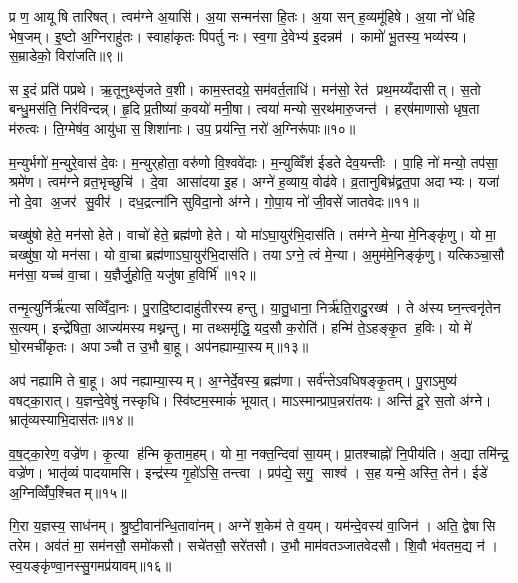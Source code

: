 प्र ण॒ आयूषि तारिषत्। त्वम॑ग्ने अ॒यासि॑। अ॒या सन्मन॑सा हि॒तः। अ॒या सन् ह॒व्यमू॑हिषे। अ॒या नो॑ धेहि भेष॒जम्। इ॒ष्टो अ॒ग्निराहु॑तः। स्वाहा॑कृतः पिपर्तु नः। स्व॒गा दे॒वेभ्य॑ इ॒दन्नम॑। कामो॑ भू॒तस्य॒ भव्य॑स्य। स॒म्राडेको॒ विरा॑जति॥९॥

स इ॒दं प्रति॑ पप्रथे। ऋ॒तूनुथ्सृ॑जते व॒शी। काम॒स्तदग्रे॒ सम॑वर्त॒ताधि॑। मन॑सो॒ रेत॑ प्रथ॒मय्यँदासीत्। स॒तो बन्धु॒मस॑ति॒ निर॑विन्दन्न्। हृ॒दि प्र॒तीष्या॑ क॒वयो॑ मनी॒षा। त्वया॑ मन्यो स॒रथ॑मारु॒जन्त॑। हर्‌ष॑माणासो धृष॒ता म॑रुत्वः। ति॒ग्मेष॑व॒ आयु॑धा स॒शिशा॑नाः। उप॒ प्रय॑न्ति॒ नरो॑ अ॒ग्निरू॑पाः॥१०॥

म॒न्युर्भगो॑ म॒न्युरे॒वास॑ दे॒वः। म॒न्युर्‌होता॒ वरु॑णो वि॒श्ववे॑दाः। म॒न्युव्विँश॑ ईडते देव॒यन्तीः। पा॒हि नो॑ मन्यो॒ तप॑सा॒ श्रमे॑ण। त्वम॑ग्ने व्रत॒भृच्छुचि॑। दे॒वा आसा॑दया इ॒ह। अग्ने॑ ह॒व्याय॒ वोढ॑वे। व्र॒तानुबिभ्र॑द्व्रत॒पा अदाभ्यः। यजा॑ नो दे॒वा अ॒जर॑ सु॒वीर॑। दध॒द्रत्ना॑नि सुविदा॒नो अ॑ग्ने। गो॒पा॒य नो॑ जी॒वसे॑ जातवेदः॥११॥\anuvakamend[जिघासत्य॒मित्राञ्जघ॒न्वानी॑डते॒ सर्वा॒ अह॑सो वातो हृ॒दे रा॑जत्य॒ग्निरू॑पास्सुविदा॒नो अ॑ग्न॒ एक॑ञ्च]

चख्षु॑षो हेते॒ मन॑सो हेते। वाचो॑ हेते॒ ब्रह्म॑णो हेते। यो मा॑ऽघा॒युर॑भि॒दास॑ति। तम॑ग्ने मे॒न्या मे॒निङ्कृ॑णु। यो मा॒ चख्षु॑षा॒ यो मन॑सा। यो वा॒चा ब्रह्म॑णाऽघा॒युर॑भि॒दास॑ति। तयाऽग्ने॒ त्वं मे॒न्या। अ॒मुम॑मे॒निङ्कृ॑णु। यत्किञ्चा॒सौ मन॑सा॒ यच्च॑ वा॒चा। य॒ज्ञैर्जु॒होति॒ यजु॑षा ह॒विर्भि॑॥१२॥

तन्मृ॒त्युर्निर्\mbox{}ऋ॑त्या सव्विँदा॒नः। पु॒रादि॒ष्टादाहु॑तीरस्य हन्तु। या॒तु॒धाना॒ निर्\mbox{}ऋ॑ति॒रादु॒रख्ष॑। ते अ॑स्य घ्न॒न्त्वनृ॑तेन स॒त्यम्। इन्द्रे॑षिता॒ आज्य॑मस्य मथ्नन्तु। मा तथ्समृ॑द्धि॒ यद॒सौ क॒रोति॑। हन्मि॑ ते॒ऽहङ्कृ॒त ह॒विः। यो मे॑ घो॒रमची॑कृतः। अपाञ्चौ त उ॒भौ बा॒हू। अप॑नह्याम्या॒स्यम्॥१३॥

अप॑ नह्यामि ते बा॒हू। अप॑ नह्याम्या॒स्यम्। अ॒ग्नेर्दे॒वस्य॒ ब्रह्म॑णा। सर्व॑न्तेऽवधिषङ्कृ॒तम्। पु॒राऽमुष्य॑ वषट्का॒रात्। य॒ज्ञन्दे॒वेषु॑ नस्कृधि। स्वि॑ष्टम॒स्माकं॑ भूयात्। माऽस्मान्प्राप॒न्नरा॑तयः। अन्ति॑ दू॒रे स॒तो अ॑ग्ने। भ्रातृ॑व्यस्याभि॒दास॑तः॥१४॥

व॒ष॒ट्का॒रेण॒ वज्रे॑ण। कृ॒त्या ह॑न्मि कृ॒ताम॒हम्। यो मा॒ नक्त॒न्दिवा॑ सा॒यम्। प्रा॒तश्चाह्नो॑ नि॒पीय॑ति। अ॒द्या तमि॑न्द्र॒ वज्रे॑ण। भातृ॑व्यं पादयामसि। इन्द्र॑स्य गृ॒हो॑ऽसि॒ तन्त्वा। प्रप॑द्ये॒ सगु॒ साश्व॑। स॒ह यन्मे॒ अस्ति॒ तेन॑। ईडे॑ अ॒ग्निव्विँ॑प॒श्चितम्॥१५॥

गि॒रा य॒ज्ञस्य॒ साध॑नम्। श्रु॒ष्टी॒वान॑न्धि॒तावा॑नम्। अग्ने॑ श॒केम॑ ते व॒यम्। यम॑न्दे॒वस्य॑ वा॒जिन॑। अति॒ द्वेषासि तरेम। अव॑तं मा॒ सम॑नसौ॒ समो॑कसौ। सचे॑तसौ॒ सरे॑तसौ। उ॒भौ माम॑वतञ्जातवेदसौ। शि॒वौ भ॑वतम॒द्य न॑। स्व॒यङ्कृ॑ण्वा॒नस्सु॒गमप्र॑यावम्॥१६॥

